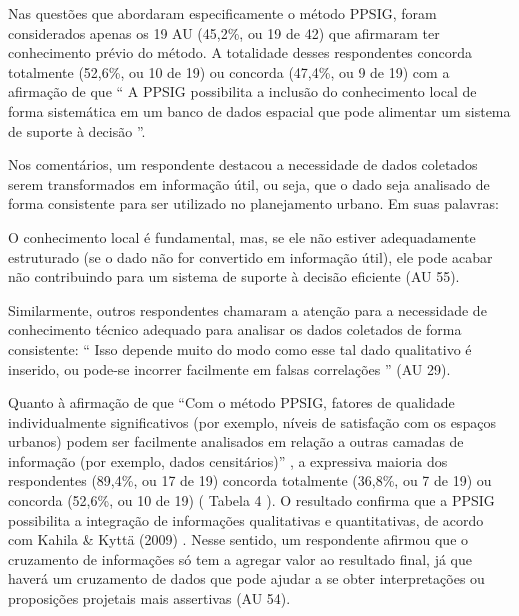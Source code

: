 \documentclass{article}
\begin{document}
Nas questões que abordaram especificamente o método PPSIG, foram considerados
					apenas os 19 AU (45,2\%, ou 19 de 42) que afirmaram ter conhecimento prévio do
					método. A totalidade desses respondentes concorda totalmente (52,6\%, ou 10 de
					19) ou concorda (47,4\%, ou 9 de 19) com a afirmação de que “%
A PPSIG
						possibilita a inclusão do conhecimento local de forma sistemática em um
						banco de dados espacial que pode alimentar um sistema de suporte à
						decisão%
”.

Nos comentários, um respondente destacou a necessidade de dados coletados serem
					transformados em informação útil, ou seja, que o dado seja analisado de forma
					consistente para ser utilizado no planejamento urbano. Em suas palavras: 

O conhecimento local é fundamental, mas, se ele não estiver adequadamente
						estruturado (se o dado não for convertido em informação útil), ele pode
						acabar não contribuindo para um sistema de suporte à decisão eficiente
(AU 55).%


Similarmente, outros respondentes chamaram a atenção para a necessidade de
					conhecimento técnico adequado para analisar os dados coletados de forma
					consistente: “%
Isso depende muito do modo como esse tal dado qualitativo
						é inserido, ou pode-se incorrer facilmente em falsas correlações%
”
					(AU 29).

Quanto à afirmação de que %
“Com o método PPSIG, fatores de qualidade
						individualmente significativos (por exemplo, níveis de satisfação com os
						espaços urbanos) podem ser facilmente analisados em relação a outras camadas
						de informação (por exemplo, dados censitários)”%
, a expressiva
					maioria dos respondentes (89,4\%, ou 17 de 19) concorda totalmente (36,8\%, ou 7
					de 19) ou concorda (52,6\%, ou 10 de 19) (%
Tabela
						4%
). O resultado confirma que a PPSIG possibilita a integração de
					informações qualitativas e quantitativas, de acordo com %
Kahila \& Kyttä (2009)%
. Nesse sentido, um respondente
					afirmou que o cruzamento de informações só tem a agregar valor ao resultado
					final, já que haverá um cruzamento de dados que pode ajudar a se obter
					interpretações ou proposições projetais mais assertivas (AU 54).
\end{document}
